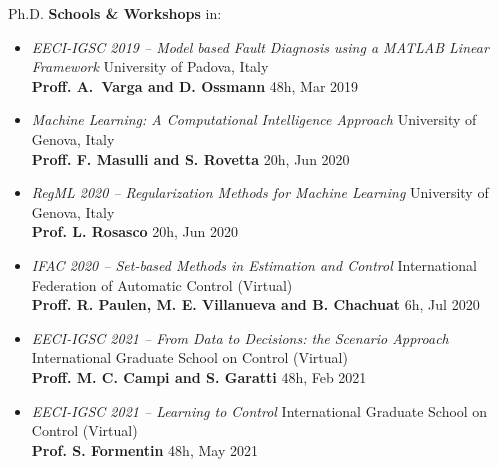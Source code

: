 \documentclass[10pt]{article}
\begin{document}
Ph.D. \textbf{Schools \& Workshops} in:
\begin{itemize}
	\setlength\itemsep{-3pt}
	\renewcommand\labelitemi{$\vcenter{\hbox{\tiny$\bullet$}}$}

	\item \textit{EECI-IGSC 2019 -- Model based Fault Diagnosis using a MATLAB Linear Framework} \hfill University of Padova, Italy\\
	\textbf{Proff. A. Varga and D. Ossmann} \hfill 48h, Mar 2019\\

	\item \textit{Machine Learning: A Computational Intelligence Approach} \hfill University of Genova, Italy\\
	\textbf{Proff. F. Masulli and S. Rovetta} \hfill 20h, Jun 2020\\
	
	\item \textit{RegML 2020 -- Regularization Methods for Machine Learning} \hfill University of Genova, Italy\\
	\textbf{Prof. L. Rosasco} \hfill 20h, Jun 2020\\

	\item \textit{IFAC 2020 -- Set-based Methods in Estimation and Control} \hfill International Federation of Automatic Control (Virtual)\\
	\textbf{Proff. R. Paulen, M. E. Villanueva and B. Chachuat} \hfill 6h, Jul 2020\\

	\item \textit{EECI-IGSC 2021 -- From Data to Decisions: the Scenario Approach} \hfill International Graduate School on Control (Virtual)\\
	\textbf{Proff. M. C. Campi and S. Garatti} \hfill 48h, Feb 2021\\

	\item \textit{EECI-IGSC 2021 -- Learning to Control} \hfill International Graduate School on Control (Virtual)\\
	\textbf{Prof. S. Formentin} \hfill 48h, May 2021\\

\end{itemize}

\vspace{6pt} %
\end{document}
